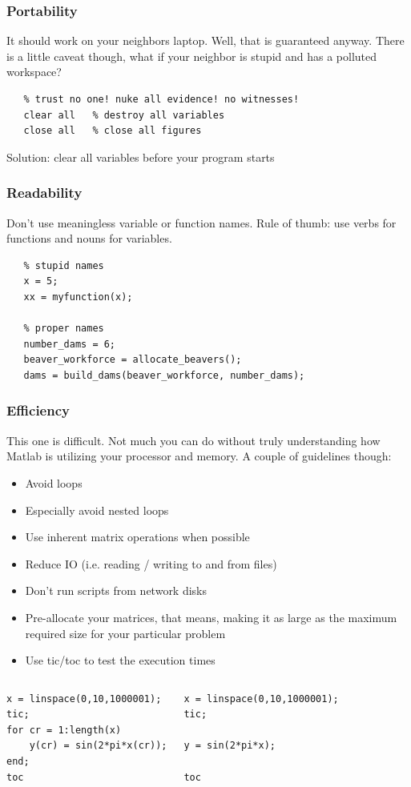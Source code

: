 \begin{frame}[fragile]
  \frametitle{Portability}
  It should work on your neighbors laptop. Well, that is guaranteed anyway. There is a little caveat though, what if your neighbor is stupid and has a polluted workspace?
  \vspace*{2em}
  \begin{lstlisting}
   % trust no one! nuke all evidence! no witnesses!
   clear all   % destroy all variables
   close all   % close all figures
  \end{lstlisting}
  \vspace*{2em}
  Solution: clear all variables before your program starts
\end{frame}

\begin{frame}[fragile]
  \frametitle{Readability}
  Don’t use meaningless variable or function names. Rule of thumb: use verbs for functions and nouns for variables.
  \vspace*{2em}
  \begin{lstlisting}
   % stupid names
   x = 5;
   xx = myfunction(x);
   
   % proper names
   number_dams = 6;
   beaver_workforce = allocate_beavers();
   dams = build_dams(beaver_workforce, number_dams);
  \end{lstlisting}
\end{frame}

\begin{frame}[fragile]
  \frametitle{Efficiency}
  This one is difficult. Not much you can do without truly understanding how Matlab is utilizing your processor and memory. A couple of guidelines though:
  \begin{itemize}
      \item Avoid loops
      \item Especially avoid nested loops
      \item Use inherent matrix operations when possible
      \item Reduce IO (i.e. reading / writing to and from files)
      \item Don’t run scripts from network disks
      \item Pre-allocate your matrices, that means, making it as large as the maximum required size for your particular problem
      \item Use tic/toc to test the execution times
  \end{itemize}
  \begin{columns}
    \begin{lstlisting}
x = linspace(0,10,1000001);
tic; 
for cr = 1:length(x)
    y(cr) = sin(2*pi*x(cr));
end; 
toc
    \end{lstlisting}
    \begin{lstlisting}
x = linspace(0,10,1000001);
tic; 

y = sin(2*pi*x);

toc
    \end{lstlisting}
  \end{columns}
\end{frame}

